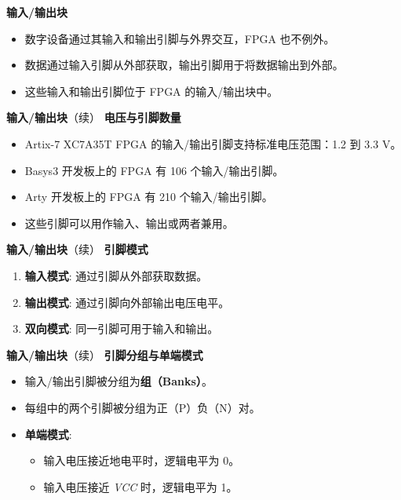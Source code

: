 \documentclass[
  ignorenonframetext,
  chinese,
]{beamer}
\providecommand{\tightlist}{%
  \setlength{\itemsep}{0pt}\setlength{\parskip}{0pt}}
\begin{document}
\begin{frame}
\begin{block}{\textbf{输入/输出块}}
\label{ux8f93ux5165ux8f93ux51faux5757}
\begin{itemize}
\tightlist
\item 数字设备通过其输入和输出引脚与外界交互，FPGA 也不例外。
\item 数据通过输入引脚从外部获取，输出引脚用于将数据输出到外部。
\item 这些输入和输出引脚位于 FPGA 的输入/输出块中。
\end{itemize}
\end{block}
\end{frame}

\begin{frame}
\begin{block}{\textbf{输入/输出块}（续）}
\textbf{电压与引脚数量}
\begin{itemize}
\tightlist
\item Artix-7 XC7A35T FPGA 的输入/输出引脚支持标准电压范围：1.2 到 3.3 V。
\item Basys3 开发板上的 FPGA 有 106 个输入/输出引脚。
\item Arty 开发板上的 FPGA 有 210 个输入/输出引脚。
\item 这些引脚可以用作输入、输出或两者兼用。
\end{itemize}
\end{block}
\end{frame}

\begin{frame}
\begin{block}{\textbf{输入/输出块}（续）}
\textbf{引脚模式}
\begin{enumerate}
\tightlist
\item \textbf{输入模式}: 通过引脚从外部获取数据。
\item \textbf{输出模式}: 通过引脚向外部输出电压电平。
\item \textbf{双向模式}: 同一引脚可用于输入和输出。
\end{enumerate}
\end{block}
\end{frame}

\begin{frame}
\begin{block}{\textbf{输入/输出块}（续）}
\textbf{引脚分组与单端模式}
\begin{itemize}
\tightlist
\item 输入/输出引脚被分组为\textbf{组（Banks）}。
\item 每组中的两个引脚被分组为正（P）负（N）对。
\item \textbf{单端模式}:
\begin{itemize}
\tightlist
\item 输入电压接近地电平时，逻辑电平为 0。
\item 输入电压接近 \emph{VCC} 时，逻辑电平为 1。
\end{itemize}
\end{itemize}
\end{block}
\end{frame}
\end{document}
